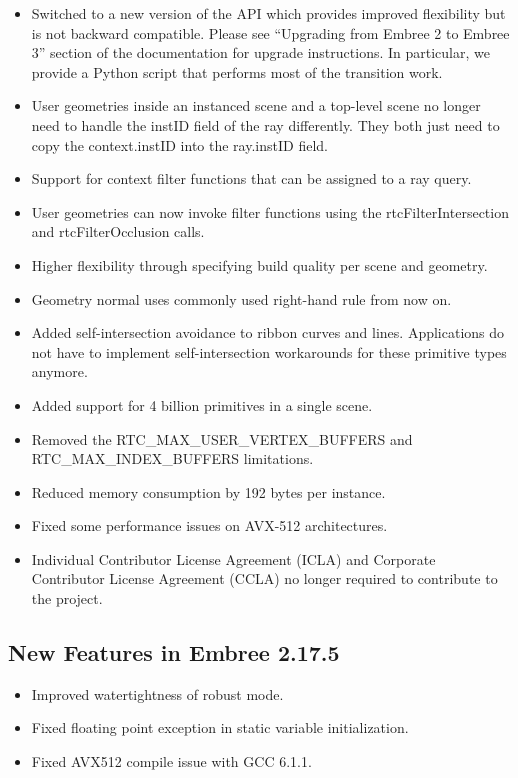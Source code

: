 \begin{itemize}
\tightlist
\item
  Switched to a new version of the API which provides improved
  flexibility but is not backward compatible. Please see ``Upgrading
  from Embree 2 to Embree 3'' section of the documentation for upgrade
  instructions. In particular, we provide a Python script that performs
  most of the transition work.
\item
  User geometries inside an instanced scene and a top-level scene no
  longer need to handle the instID field of the ray differently. They
  both just need to copy the context.instID into the ray.instID field.
\item
  Support for context filter functions that can be assigned to a ray
  query.
\item
  User geometries can now invoke filter functions using the
  rtcFilterIntersection and rtcFilterOcclusion calls.
\item
  Higher flexibility through specifying build quality per scene and
  geometry.
\item
  Geometry normal uses commonly used right-hand rule from now on.
\item
  Added self-intersection avoidance to ribbon curves and lines.
  Applications do not have to implement self-intersection workarounds
  for these primitive types anymore.
\item
  Added support for 4 billion primitives in a single scene.
\item
  Removed the RTC\_MAX\_USER\_VERTEX\_BUFFERS and
  RTC\_MAX\_INDEX\_BUFFERS limitations.
\item
  Reduced memory consumption by 192 bytes per instance.
\item
  Fixed some performance issues on AVX-512 architectures.
\item
  Individual Contributor License Agreement (ICLA) and Corporate
  Contributor License Agreement (CCLA) no longer required to contribute
  to the project.
\end{itemize}

\subsection{New Features in Embree
2.17.5}\label{new-features-in-embree-2.17.5}

\begin{itemize}
\tightlist
\item
  Improved watertightness of robust mode.
\item
  Fixed floating point exception in static variable initialization.
\item
  Fixed AVX512 compile issue with GCC 6.1.1.
\end{itemize}

